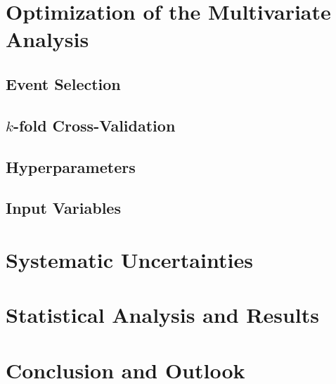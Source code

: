 \documentclass[12pt,a4paper,openright]{scrreprt}
\begin{document}
\chapter{Optimization of the Multivariate Analysis}
\label{cha:mva_strategy}

\section{Event Selection}
\label{sec:event}

\section{$k$-fold Cross-Validation}
\label{sec:_k_fold_cross_validation}

\section{Hyperparameters}
\label{sec:hyperparameters}

\section{Input Variables}
\label{sec:input_variables}

\chapter{Systematic Uncertainties}
\label{cha:systematic_uncertainties}

\chapter{Statistical Analysis and Results}
\label{cha:statistical_analysis_and_results}

\chapter{Conclusion and Outlook}
\label{cha:conclusion}

%
% 
% 
\end{document}
